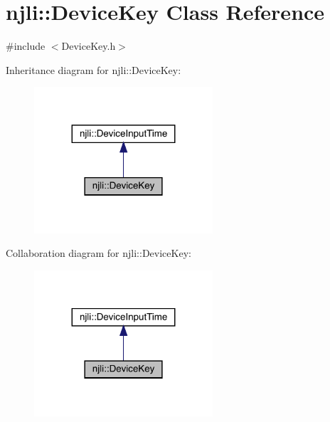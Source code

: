 \hypertarget{classnjli_1_1_device_key}{}\section{njli\+:\+:Device\+Key Class Reference}
\label{classnjli_1_1_device_key}


{\ttfamily \#include $<$Device\+Key.\+h$>$}



Inheritance diagram for njli\+:\+:Device\+Key\+:\nopagebreak
\begin{figure}[H]
\begin{center}
\leavevmode
\includegraphics[width=188pt]{classnjli_1_1_device_key__inherit__graph}
\end{center}
\end{figure}


Collaboration diagram for njli\+:\+:Device\+Key\+:\nopagebreak
\begin{figure}[H]
\begin{center}
\leavevmode
\includegraphics[width=188pt]{classnjli_1_1_device_key__coll__graph}
\end{center}
\end{figure}
